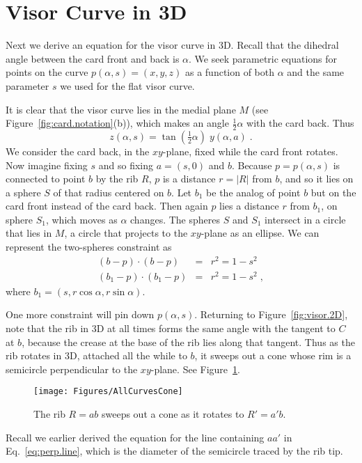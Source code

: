 \pdfoutput=1  \documentclass[]{article}
\newcommand{\eqnlab}[1]{\label{eq:#1}}
\newcommand{\figlab}[1]{\label{fig:#1}}
\newcommand{\eqnref}[1]{\ref{eq:#1}}
\newcommand{\figref}[1]{\ref{fig:#1}}
\def\a{{\alpha}}
\begin{document}
\section{Visor Curve in 3D}
Next we derive an equation for the visor curve in 3D.
Recall that the dihedral angle between the card front and back is $\a$.
We seek parametric equations for points on the curve $p(\a,s) = (x,y,z)$
as a function of both $\a$ and the same parameter $s$ we used for the flat visor curve.

It is clear that the visor curve lies in the medial plane $M$ (see Figure~\figref{card.notation}(b)), which makes
an angle $\tfrac{1}{2} \a$ with the card back. Thus
$$
z(\a,s) = \tan (\tfrac{1}{2} \a) \;  y(\a,a) \; .
\eqnlab{zy}
$$
We consider the card back, in the $xy$-plane, fixed while the card front rotates.
Now imagine fixing $s$ and so fixing $a=(s,0)$ and $b$.
Because $p=p(\a,s)$ is connected to point $b$ by the rib $R$,
$p$ is a distance $r=|R|$ from $b$, and so it lies on a sphere $S$ of that
radius centered on $b$.
Let $b_1$ be the analog of point $b$ but on the card front instead of the card back.
Then again $p$ lies a distance $r$ from $b_1$, on sphere $S_1$,
which moves as $\a$ changes.
The spheres $S$ and $S_1$ intersect in a circle that lies in $M$, a circle that projects to the $xy$-plane
as an ellipse.
We can represent the two-spheres constraint as
\begin{eqnarray}
(b - p) \cdot (b - p) &=& r^2 = 1-s^2 \\
(b_1 - p) \cdot (b_1 - p) &=& r^2 = 1-s^2 \; ,
\eqnlab{spheres}
\end{eqnarray}
where $b_1 = (s, r \cos \a, r \sin \a)$.

One more constraint will pin down $p(\a,s)$.
Returning to Figure~\figref{visor.2D}, note that the rib in 3D at all times forms the same
angle with the tangent to $C$ at $b$, because the crease at the base of the rib lies along that tangent.
Thus as the rib rotates in 3D, attached all the while to $b$, it sweeps out a cone
whose rim is a semicircle perpendicular to the $xy$-plane.
See Figure~\figref{AllCurvesCone}.
\begin{figure}[htbp]
\centering
\texttt{[image: Figures/AllCurvesCone]}
\caption{The rib $R=ab$ sweeps out a cone as it rotates to $R'=a'b$.}
\figlab{AllCurvesCone}
\end{figure}
Recall we earlier derived the equation for the line containing $a a'$ in Eq.~\eqnref{perp.line},
which is the diameter of the semicircle traced by the rib tip.
\end{document}
